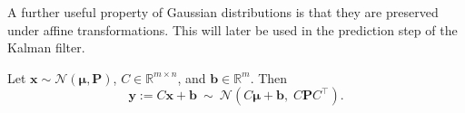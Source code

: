 



A further useful property of Gaussian distributions is that they are preserved under affine transformations. This will later be used in the prediction step of the Kalman filter.

\begin{proposition}\label{prop:affine}
Let $\mathbf{x} \sim \mathcal{N}(\boldsymbol{\mu}, \mathbf{P})$, $C \in \mathbb{R}^{m \times n}$, and $\mathbf{b} \in \mathbb{R}^m$. Then
\begin{equation}\label{eq:affine}
  \mathbf{y} := C\mathbf{x} + \mathbf{b} 
  \:\sim\:
  \mathcal{N}(C\boldsymbol{\mu} + \mathbf{b},\; C\mathbf{P}C^\top).
\end{equation}
\end{proposition}

